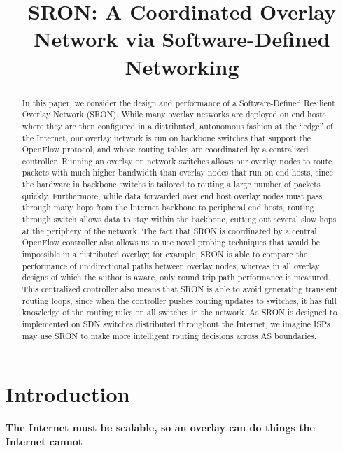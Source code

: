 \documentclass[pageno]{jpaper}
\begin{document}
\title{
SRON: A Coordinated Overlay Network via Software-Defined Networking
}
\date{}
\maketitle

\thispagestyle{empty}

\begin{abstract}

	In this paper, we consider the design and performance of a Software-Defined
Resilient Overlay Network (SRON). While many overlay networks are deployed
on end hosts where they are then configured in a distributed, autonomous
fashion at the ``edge'' of the Internet, our overlay network is run on backbone
switches that support the OpenFlow protocol, and 
whose routing tables are coordinated by a centralized controller.  Running 
an overlay on network switches allows our overlay nodes to route packets with much higher
bandwidth than overlay nodes that run on end hosts, since the hardware in backbone
switchs is tailored to routing a large number of packets quickly.  Furthermore, while data forwarded 
over end host overlay nodes must pass through many hops from the Internet backbone to peripheral
end hosts, routing through switch allows data to stay within the backbone, cutting out
several slow hops at the periphery of the network.  The fact that SRON is coordinated by 
a central OpenFlow controller also allows us to use novel probing techniques that would be impossible in a 
distributed overlay; for example, SRON is able to compare the performance of unidirectional 
paths between overlay nodes, whereas in all overlay designs of which the author is aware, only round trip path 
performance is measured.  This centralized controller also means that SRON is able to avoid
generating transient routing loops, since when the controller pushes routing updates to switches, it has 
full knowledge of the routing rules on all switches in the network.
	As SRON is designed to implemented on SDN switches distributed throughout the Internet, we imagine ISPs may use SRON to make more intelligent routing decisions across AS boundaries. 

\end{abstract}

\section{Introduction}

{\bf The Internet must be scalable, so an overlay can do things the Internet cannot}\bigskip
\end{document}
